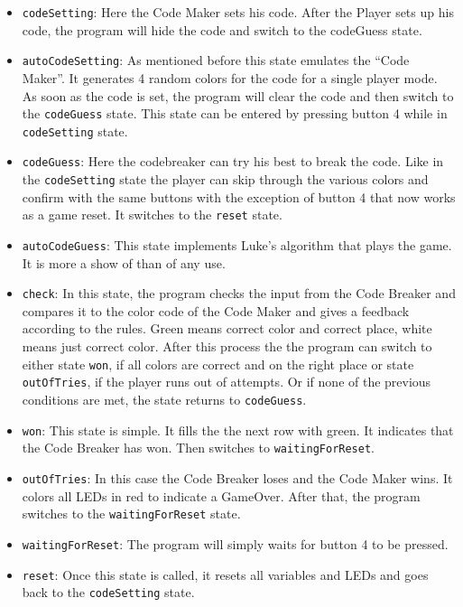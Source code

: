 \documentclass[a4paper, 12pt]{article}
\begin{document}
\begin{itemize}

    \item {\tt codeSetting}: Here the Code Maker sets his code. After
        the Player sets up his code, the program will hide the code and
        switch to the codeGuess state.

    \item {\tt autoCodeSetting}: As mentioned before this state emulates the
        “Code Maker”. It generates 4 random colors for the code for a
        single player mode. As soon as the code is set, the program will
        clear the code and then switch to the {\tt codeGuess} state. This
        state can be entered by pressing button 4 while in {\tt codeSetting}
        state. 

    \item {\tt codeGuess}: Here the codebreaker can try his best to break the
        code. Like in the {\tt codeSetting} state the player can skip through
        the various colors and confirm with the same buttons with the
        exception of button 4 that now works as a game reset. It
        switches to the {\tt reset} state. 

    \item {\tt autoCodeGuess}: This state implements Luke’s algorithm that
        plays the game. It is more a show of than of any use. 

    \item {\tt check}: In this state, the program checks the input from the
        Code Breaker and compares it to the color code of the Code Maker
        and gives a feedback according to the rules. Green means correct
        color and correct place, white means just correct color. After
        this process the the program can switch to either state {\tt won}, if
        all colors are correct and on the right place or state
        {\tt outOfTries}, if the player runs out of attempts. Or if none of
        the previous conditions are met, the state returns to {\tt codeGuess}. 

    \item {\tt won}: This state is simple. It fills the the next row with
        green. It indicates that the Code Breaker has won. Then switches
        to {\tt waitingForReset}.

    \item {\tt outOfTries}: In this case the Code Breaker loses and the Code
        Maker wins. It colors all LEDs in red to indicate a GameOver.
        After that, the program switches to the {\tt waitingForReset} state.

    \item {\tt waitingForReset}: The program will simply waits for button 4 to
        be pressed.
        
    \item {\tt reset}: Once this state is called, it resets all variables and
        LEDs and goes back to the {\tt codeSetting} state. 

\end{itemize}
\end{document}
